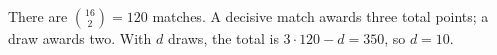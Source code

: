 There are $\binom{16}2=120$ matches. A decisive match awards three total points; a draw awards two. With $d$ draws, the total is $3\cdot120-d=350$, so $\boxed{d=10}$.
